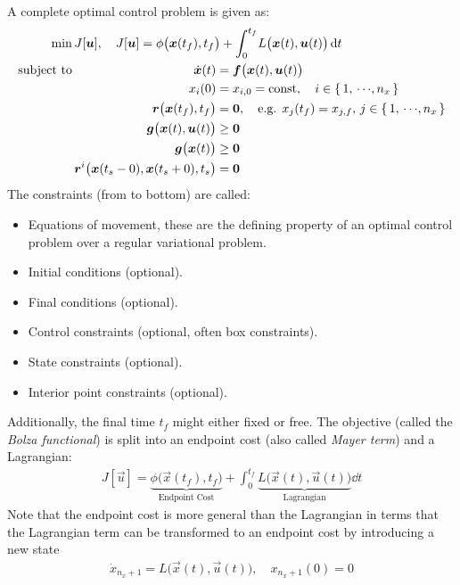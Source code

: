 	A complete optimal control problem is given as:
	\begin{align*}
		\min &\, J[\bm{u}],\quad J[\bm{u}] = \phi\big(\bm{x}(t_f), t_f\big) + \int_{0}^{t_f} \! L\big(\bm{x}(t), \bm{u}(t)\big) \dd{t} \\
		\mathrm{subject~to} &\,
			\begin{alignedat}[t]{2}
				\dot{\bm{x}}(t) &= \bm{f}\big(\bm{x}(t), \bm{u}(t)\big) \\
				x_i(0) &= x_{i, 0} = \operatorname{const},\quad i \in \{\, 1,\,\cdots\!,n_x \,\} \\
				\bm{r}\big(\bm{x}(t_f), t_f\big) &= \bm{0},\quad \text{e.g. } x_j(t_f) = x_{j, f},\, j \in \{\, 1,\,\cdots\!,n_x \,\} \\
				\bm{g}\big(\bm{x}(t), \bm{u}(t)\big) &\geq \bm{0} \\
				\bm{g}\big(\bm{x}(t)\big) &\geq \bm{0} \\
				\bm{r}^i\big( \bm{x}(t_s - 0), \bm{x}(t_s + 0), t_s \big) &= \bm{0}
			\end{alignedat}
	\end{align*}
	The constraints (from to bottom) are called:
	\begin{itemize}
		\item Equations of movement, these are the defining property of an optimal control problem over a regular variational problem.
		\item Initial conditions (optional).
		\item Final conditions (optional).
		\item Control constraints (optional, often box constraints).
		\item State constraints (optional).
		\item Interior point constraints (optional).
	\end{itemize}
	Additionally, the final time \(t_f\) might either fixed or free. The objective (called the \emph{Bolza functional}) is split into an endpoint cost (also called \emph{Mayer term}) and a Lagrangian:
	\begin{align*}
		J[\vec{u}] = \underbrace{\phi\big(\vec{x}(t_f), t_f\big)}_{\text{Endpoint Cost}}
			+ \int_{0}^{t_f} \! \underbrace{L\big(\vec{x}(t), \vec{u}(t)\big)}_{\text{Lagrangian}} \dd{t}
	\end{align*}
	Note that the endpoint cost is more general than the Lagrangian in terms that the Lagrangian term can be transformed to an endpoint cost by introducing a new state
	\begin{align*}
		\dot{x}_{n_x + 1} = L\big(\vec{x}(t), \vec{u}(t)\big),\quad x_{n_x + 1}(0) = 0
	\end{align*}
